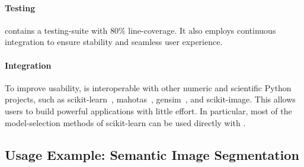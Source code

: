 \paragraph{Testing}
     \pystruct contains a testing-suite with 80\% line-coverage. It also
     employs continuous integration to ensure stability and seamless user
     experience.

\paragraph{Integration}
     To improve usability, \pystruct is interoperable with other numeric and
     scientific Python projects, such as {\sc
     scikit-learn}~\citep{pedregosa2011scikit},
     {\sc mahotas}~\citep{coelho:mahotas}, {\sc gensim}~\citep{rehurek_lrec},
     and {\sc scikit-image}.  This allows users to build powerful applications
     with little effort. In particular, most of the model-selection methods of
     {\sc scikit-learn} can be used directly with \pystruct.


\subsection{Usage Example: Semantic Image Segmentation}\label{sec:examples}

%

